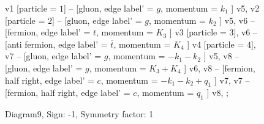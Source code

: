 \documentclass{revtex4}
\begin{document}
\begin{figure}[!htb]
\begin{center}
{    %
v1 [particle = \(1\)] -- [gluon, edge label' = \(g\), momentum = \(k_{1}\) ] v5, 
v2 [particle = \(2\)] -- [gluon, edge label' = \(g\), momentum = \(k_{2}\) ] v5, 
v6 -- [fermion, edge label' = \(t\), momentum = \(K_{3}\) ] v3 [particle = \(3\)], 
v6 -- [anti fermion, edge label' = \(\overline{t}\), momentum = \(K_{4}\) ] v4 [particle = \(4\)], 
v7 -- [gluon, edge label' = \(g\), momentum = \(-k_{1} - k_{2}\) ] v5, 
v8 -- [gluon, edge label' = \(g\), momentum = \(K_{3} + K_{4}\) ] v6, 
v8 -- [fermion, half right, edge label' = \(c\), momentum = \(-k_{1} - k_{2} + q_{1}\) ] v7, 
v7 -- [fermion, half right, edge label' = \(c\), momentum = \(q_{1}\) ] v8, 
};
\end{center}
\caption{Diagram9, Sign: -1, Symmetry factor: 1}
\end{figure}
\newpage
\end{document}
